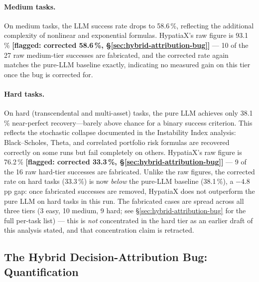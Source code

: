 \documentclass[twoside,11pt]{article}
\begin{document}
\paragraph{Medium tasks.}
On medium tasks, the LLM success rate drops to 58.6\,\%, reflecting the additional
complexity of nonlinear and exponential formulas.  HypatiaX's raw figure is 93.1\,\%
\textbf{[flagged: corrected 58.6\,\%, \S\ref{sec:hybrid-attribution-bug}]}
--- 10 of the 27 raw medium-tier successes are fabricated, and the corrected
rate again matches the pure-LLM baseline exactly, indicating no measured gain
on this tier once the bug is corrected for.

\paragraph{Hard tasks.}
On hard (transcendental and multi-asset) tasks, the pure LLM achieves only 38.1\,\%
near-perfect recovery---barely above chance for a binary success criterion.  This
reflects the stochastic collapse documented in the Instability Index analysis:
Black--Scholes, Theta, and correlated portfolio risk formulas are recovered correctly
on some runs but fail completely on others.  HypatiaX's raw figure is 76.2\,\%
\textbf{[flagged: corrected 33.3\,\%, \S\ref{sec:hybrid-attribution-bug}]} ---
9 of the 16 raw hard-tier successes are fabricated. Unlike the raw figures,
the corrected rate on hard tasks (33.3\,\%) is now \emph{below} the pure-LLM
baseline (38.1\,\%), a $-4.8$\,pp gap: once fabricated successes are removed,
HypatiaX does not outperform the pure LLM on hard tasks in this run.
The fabricated cases are spread across all three tiers (3 easy, 10 medium, 9
hard; see \S\ref{sec:hybrid-attribution-bug} for the full per-task list) ---
this is \emph{not} concentrated in the hard tier as an earlier draft of this
analysis stated, and that concentration claim is retracted.

\subsection{The Hybrid Decision-Attribution Bug: Quantification}\label{subsec:the-hybrid-decisionattribution-bug-quant}
\label{sec:hybrid-attribution-bug}
\end{document}
